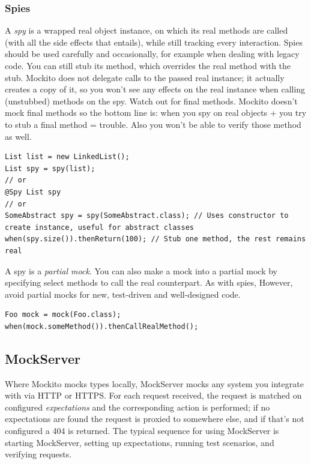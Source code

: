 \documentclass[table, xcdraw]{article}%
\begin{document}
\subsubsection{Spies}

A \emph{spy} is a wrapped real object instance, on which its real methods are called (with all the side effects that entails), while still tracking every interaction. Spies should be used carefully and occasionally, for example when dealing with legacy code. You can still stub its method, which overrides the real method with the stub. Mockito does not delegate calls to the passed real instance; it actually creates a copy of it, so you won't see any effects on the real instance when calling (unstubbed) methods on the spy. Watch out for final methods. Mockito doesn't mock final methods so the bottom line is: when you spy on real objects + you try to stub a final method = trouble. Also you won't be able to verify those method as well.

\begin{verbatim}
List list = new LinkedList();
List spy = spy(list);
// or
@Spy List spy
// or
SomeAbstract spy = spy(SomeAbstract.class); // Uses constructor to create instance, useful for abstract classes
when(spy.size()).thenReturn(100); // Stub one method, the rest remains real
\end{verbatim}

A spy is a \emph{partial mock}. You can also make a mock into a partial mock by specifying select methods to call the real counterpart. As with spies, However, avoid partial mocks for new, test-driven and well-designed code.

\begin{verbatim}
Foo mock = mock(Foo.class);
when(mock.someMethod()).thenCallRealMethod();
\end{verbatim}

\subsection{MockServer}

Where Mockito mocks types locally, MockServer mocks any system you integrate with via HTTP or HTTPS. For each request received, the request is matched on configured \emph{expectations} and the corresponding action is performed; if no expectations are found the request is proxied to somewhere else, and if that's not configured a 404 is returned. The typical sequence for using MockServer is starting MockServer, setting up expectations, running test scenarios, and verifying requests.
\end{document}

